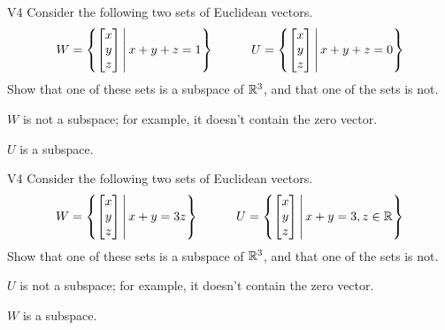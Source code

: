 \begin{problem}{V4}
Consider the following two sets of Euclidean vectors.
\[
  W = \left\{\begin{bmatrix} x \\ y \\ z \end{bmatrix}\,\middle|\,x+y+z=1\right\}
\hspace{3em}
  U = \left\{\begin{bmatrix} x \\ y \\ z \end{bmatrix}\,\middle|\,x+y+z=0\right\}
\]
Show that one of these sets is a subspace of \(\mathbb{R}^3\), and
that one of the sets is not.
\end{problem}
\begin{solution}
\(W\) is not a subspace; for example, it doesn't contain the zero vector.

\(U\) is a subspace.
\end{solution}


\begin{problem}{V4}
Consider the following two sets of Euclidean vectors.
\[
  W = \left\{\begin{bmatrix} x \\ y \\ z \end{bmatrix}\,\middle|\,x+y=3z\right\}
\hspace{3em}
  U = \left\{\begin{bmatrix} x \\ y \\ z \end{bmatrix}\,\middle|\,x+y=3,z\in\mathbb{R}\right\}
\]
Show that one of these sets is a subspace of \(\mathbb{R}^3\), and
that one of the sets is not.
\end{problem}
\begin{solution}
\(U\) is not a subspace; for example, it doesn't contain the zero vector.

\(W\) is a subspace.
\end{solution}

